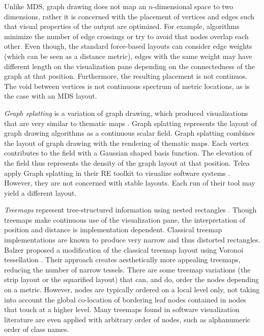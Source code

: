 Unlike MDS, graph drawing does not map an $n$-dimensional space to two dimensions, rather it is concerned with the placement of vertices and edges such that visual properties of the output are optimized. For example, algorithms minimize the number of edge crossings or try to avoid that nodes overlap each other. Even though, the standard force-based layouts can consider edge weights (which can be seen as a distance metric), edges with the same weight may have different length on the visualization pane depending on the connectedness of the graph at that position. Furthermore, the resulting placement is not continuos. The void between vertices is not continuous spectrum of metric locations, as is the case with an MDS layout.

\emph{Graph splatting} is a variation of graph drawing, which produced visualizations that are very similar to thematic maps \cite{Lier03a}. Graph splatting represents the layout of graph drawing algorithms as a continuous scalar field. Graph splatting combines the layout of graph drawing with the rendering of thematic maps. Each vertex contributes to the field with a Gaussian shaped basis function. The elevation of the field thus represents the density of the graph layout at that position. Telea \etal apply Graph splatting in their RE toolkit to visualize software systems \cite{Tele03a}. However, they are not concerned with stable layouts. Each run of their tool may yield a different layout.

\emph{Treemaps} represent tree-structured information using nested rectangles \cite{Ware04a}.
Though treemaps make continuous use of the visualization pane, the interpretation of position and distance is implementation dependent. Classical treemap implementations are known to produce very narrow and thus distorted rectangles. Balzer \etal proposed a modification of the classical treemap layout using Voronoi tessellation \cite{Balz05a}. Their approach creates aesthetically more appealing treemaps, reducing the number of narrow tessels. There are some treemap variations (\eg the strip layout or the squarified layout) that can, and do, order the nodes depending on a metric. However, nodes are typically ordered on a local level only, not taking into account the global co-location of bordering leaf nodes contained in nodes that touch at a higher level. Many treemaps found in software visualization literature are even applied with arbitrary order of nodes, such as alphanumeric order of class names. 


